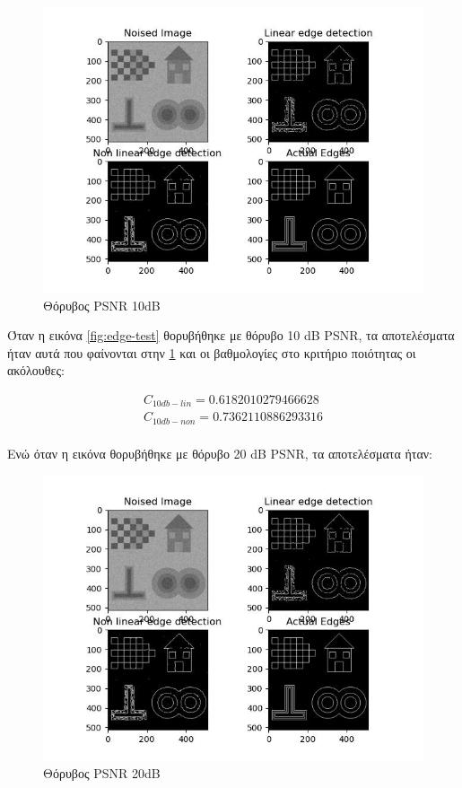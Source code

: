 \documentclass{article}
\newcommand{\eng}[1]{\foreignlanguage{english}{#1}}
\begin{document}
\begin{figure}[h!]
    \includegraphics[width=\textwidth]{../image-plots/edges-intro0.jpg}
    \caption{Θόρυβος \eng{PSNR} 10\eng{dB}}
    \label{fig:noise 10db}
\end{figure}
\FloatBarrier

Όταν η εικόνα \ref{fig:edge-test} θορυβήθηκε με θόρυβο 10 \eng{dB PSNR}, τα αποτελέσματα ήταν αυτά που φαίνονται στην \ref{fig:noise 10db} και οι βαθμολογίες στο κριτήριο ποιότητας οι ακόλουθες:

\begin{equation}
    \begin{gathered}
        C_{10db-lin} = 0.6182010279466628\\
        C_{10db-non} = 0.7362110886293316\\
    \end{gathered}
\end{equation}

Ενώ όταν η εικόνα θορυβήθηκε με θόρυβο 20 \eng{dB PSNR}, τα αποτελέσματα ήταν:

\begin{figure}[h]
        \includegraphics[width=\textwidth]{../image-plots/edges-intro0.jpg}
        \caption{Θόρυβος \eng{PSNR} 20\eng{dB}}
\end{figure}
\FloatBarrier
\end{document}
